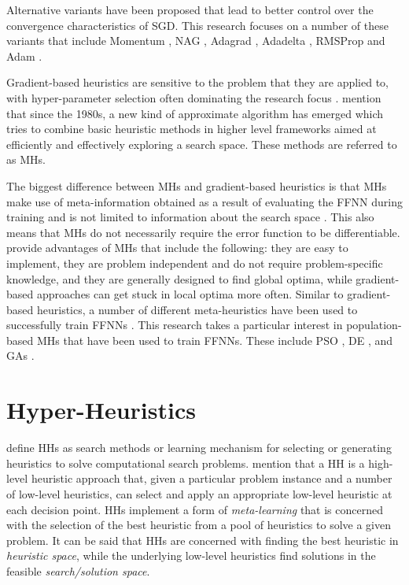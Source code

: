 \documentclass[preprint,review,12pt]{elsarticle}
\begin{document}
Alternative variants have been proposed that lead to better control over the convergence characteristics of \acs{SGD}. This research focuses on a number of these variants that include \acf{Momentum} \citep{ref:qian:1999}, \acf{NAG} \citep{ref:sutskever:2013}, \acf{Adagrad} \citep{ref:duchi:2011}, \acs{Adadelta} \citep{ref:zeiler:2012}, \acf{RMSProp} \citep{ref:hinton:2012} and \acf{Adam} \citep{ref:kingma:2014}.

Gradient-based heuristics are sensitive to the problem that they are applied to, with hyper-parameter selection often dominating the research focus \citep{ref:bengio:2000}. \citet{ref:blum:2003} mention that since the 1980s, a new kind of approximate algorithm has emerged which tries to combine basic heuristic methods in higher level frameworks aimed at efficiently and effectively exploring a search space. These methods are referred to as \acp{MH}.

The biggest difference between \acp{MH} and gradient-based heuristics is that \acp{MH} make use of meta-information obtained as a result of evaluating the \acs{FFNN} during training and is not limited to information about the search space \citep{ref:blum:2003}. This also means that \acp{MH} do not necessarily require the error function to be differentiable. \citet{ref:blum:2003} provide advantages of \acp{MH} that include the following: they are easy to implement, they are problem independent and do not require problem-specific knowledge, and they are generally designed to find global optima, while gradient-based approaches can get stuck in local optima more often. Similar to gradient-based heuristics, a number of different meta-heuristics have been used to successfully train \acp{FFNN} \citep{ref:rakitianskaia:2012, ref:vanwyk:2014, ref:gupta:1999}. This research takes a particular interest in population-based \acp{MH} that have been used to train \acp{FFNN}. These include \acf{PSO} \citep{ref:abdulkarim:2021}, \acf{DE} \citep{ref:xue:2022}, and \acfp{GA} \citep{ref:khan:2012}.


\section{Hyper-Heuristics}
\label{sec:hhs}

\citet{ref:burke:2010} define \acp{HH} as search methods or learning mechanism for selecting or generating heuristics to solve computational search problems. \citet{ref:burke:2003} mention that a \acs{HH} is a high-level heuristic approach that, given a particular problem instance and a number of low-level heuristics, can select and apply an appropriate low-level heuristic at each decision point. \acp{HH} implement a form of \textit{meta-learning} that is concerned with the selection of the best heuristic from a pool of heuristics to solve a given problem. It can be said that \acp{HH} are concerned with finding the best heuristic in \textit{heuristic space}, while the underlying low-level heuristics find solutions in the feasible \textit{search/solution space}.
\end{document}
